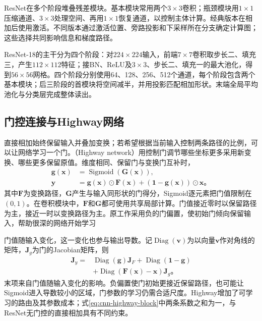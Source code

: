 ResNet在多个阶段堆叠残差模块。基本模块常用两个$3\times3$卷积；瓶颈模块用$1\times1$压缩通道、$3\times3$处理空间、再用$1\times1$恢复通道，以控制主体计算。经典版本在相加后使用激活。不同版本通过激活位置、旁路投影和下采样所在分支确定计算图；这些选择共同影响信息和梯度路径。

ResNet-18的主干分为四个阶段：对$224\times224$输入，前端$7\times7$卷积取步长二、填充三，产生$112\times112$特征；接BN、ReLU及$3\times3$、步长二、填充一的最大池化，得到$56\times56$网格。四个阶段分别使用64、128、256、512个通道，每个阶段包含两个基本模块；后三阶段的首模块将空间减半，并用投影匹配相加形状。末端全局平均池化与分类层完成整体读出。

\subsection{门控连接与Highway网络}
\label{sec:cnn-highway}

直接相加始终保留输入并叠加变换；若希望根据当前输入控制两条路径的比例，可以让网络学习一个门。（Highway network）用控制门调节哪些坐标更多采用新变换、哪些更多保留原值。维度相同、保留门与变换门互补时，
\begin{equation}
  \begin{aligned}
    \bm g(\bm x)&=\operatorname{Sigmoid}(\bm G(\bm x)),\\
    \bm y&=\bm g(\bm x)\odot\bm F(\bm x)
            +(\bm1-\bm g(\bm x))\odot\bm x\text{。}
  \end{aligned}
  \label{eq:cnn-highway-block}
\end{equation}
其中$\bm F$为变换路径，$\bm G$产生与输入同形状的门得分，Sigmoid逐元素把门值限制在$(0,1)$。在卷积模块中，$\bm F$和$\bm G$都可使用共享局部计算。门值接近零时以保留路径为主，接近一时以变换路径为主。原工作采用负的门偏置，使初始门倾向保留输入，帮助很深的网络开始学习

门值随输入变化，这一变化也参与输出导数。记$\operatorname{Diag}(\bm v)$为以向量$\bm v$作对角线的矩阵，$\bm J_g$为门的Jacobian矩阵，则
\begin{equation}
  \begin{aligned}
    \bm J_y={}&\operatorname{Diag}(\bm g)\bm J_F
      +\operatorname{Diag}(\bm1-\bm g)\\
      &+\operatorname{Diag}(\bm F(\bm x)-\bm x)\bm J_g\text{。}
  \end{aligned}
  \label{eq:cnn-highway-gradient}
\end{equation}
末项来自门值随输入变化的影响。负偏置使门初始更接近保留路径，也可能让Sigmoid进入导数较小的区域，门参数的学习仍需合适尺度。Highway增加了可学习的路由及其参数成本；式\eqref{eq:cnn-highway-block}中两条系数之和为一，与ResNet无门控的直接相加具有不同约束。

